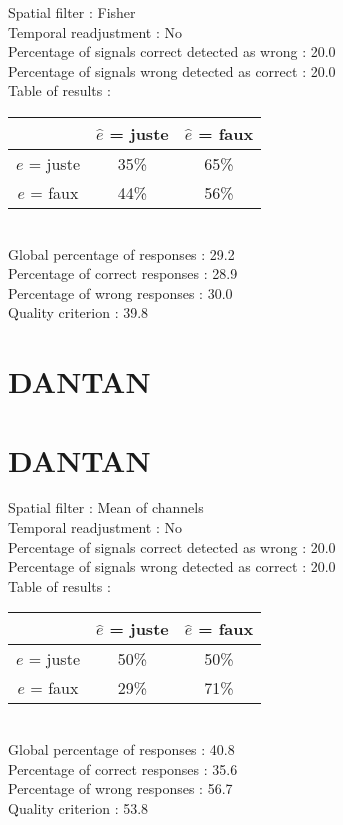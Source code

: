 Spatial filter : Fisher \\
Temporal readjustment : No \\
Percentage of signals correct detected as wrong :   20.0 \\
Percentage of signals wrong detected as correct :   20.0 \\
Table of results : \\
\begin{tabular}{|c|c|c|}
\hline				& $\hat{e}$ = juste & $\hat{e}$ = faux \\
\hline  $e$ = juste	&     35\%			&     65\%		\\
\hline  $e$ = faux	&     44\%			&     56\%		\\
\hline
\end{tabular}\\
Global percentage of responses :   29.2 \\
Percentage of correct responses :   28.9 \\
Percentage of wrong responses :   30.0 \\
Quality criterion :   39.8 \\

\section*{DANTAN}
\section*{DANTAN}
Spatial filter : Mean of channels \\
Temporal readjustment : No \\
Percentage of signals correct detected as wrong :   20.0 \\
Percentage of signals wrong detected as correct :   20.0 \\
Table of results : \\
\begin{tabular}{|c|c|c|}
\hline				& $\hat{e}$ = juste & $\hat{e}$ = faux \\
\hline  $e$ = juste	&     50\%			&     50\%		\\
\hline  $e$ = faux	&     29\%			&     71\%		\\
\hline
\end{tabular}\\
Global percentage of responses :   40.8 \\
Percentage of correct responses :   35.6 \\
Percentage of wrong responses :   56.7 \\
Quality criterion :   53.8 \\

